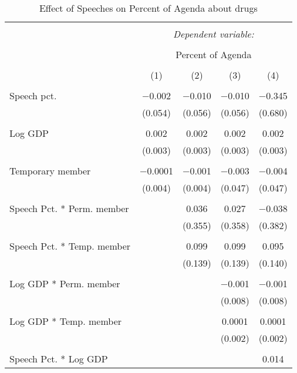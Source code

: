 
\begin{table}[!htbp] \centering 
  \caption{Effect of Speeches on Percent of Agenda about  drugs} 
  \label{} 
\begin{tabular}{@{\extracolsep{5pt}}lcccc} 
\\[-1.8ex]\hline 
\hline \\[-1.8ex] 
 & \multicolumn{4}{c}{\textit{Dependent variable:}} \\ 
\cline{2-5} 
\\[-1.8ex] & \multicolumn{4}{c}{Percent of Agenda} \\ 
\\[-1.8ex] & (1) & (2) & (3) & (4)\\ 
\hline \\[-1.8ex] 
 Speech pct. & $-$0.002 & $-$0.010 & $-$0.010 & $-$0.345 \\ 
  & (0.054) & (0.056) & (0.056) & (0.680) \\ 
  & & & & \\ 
 Log GDP & 0.002 & 0.002 & 0.002 & 0.002 \\ 
  & (0.003) & (0.003) & (0.003) & (0.003) \\ 
  & & & & \\ 
 Temporary member & $-$0.0001 & $-$0.001 & $-$0.003 & $-$0.004 \\ 
  & (0.004) & (0.004) & (0.047) & (0.047) \\ 
  & & & & \\ 
 Speech Pct. * Perm. member &  & 0.036 & 0.027 & $-$0.038 \\ 
  &  & (0.355) & (0.358) & (0.382) \\ 
  & & & & \\ 
 Speech Pct. * Temp. member &  & 0.099 & 0.099 & 0.095 \\ 
  &  & (0.139) & (0.139) & (0.140) \\ 
  & & & & \\ 
 Log GDP * Perm. member &  &  & $-$0.001 & $-$0.001 \\ 
  &  &  & (0.008) & (0.008) \\ 
  & & & & \\ 
 Log GDP * Temp. member &  &  & 0.0001 & 0.0001 \\ 
  &  &  & (0.002) & (0.002) \\ 
  & & & & \\ 
 Speech Pct. * Log GDP &  &  &  & 0.014 \\ 

\end{tabular}
\end{table}
